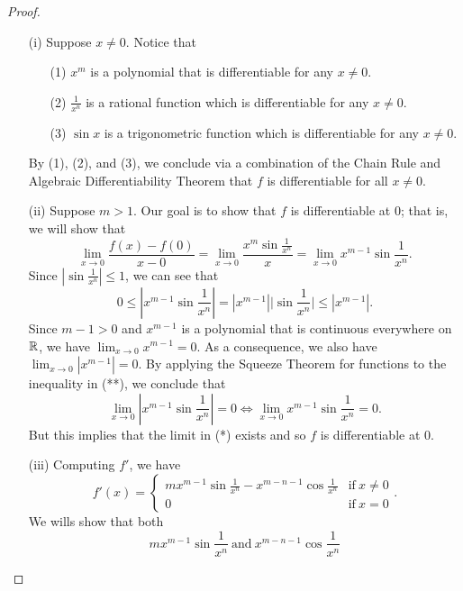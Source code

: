 \documentclass[a4paper]{article}
\begin{document}
\begin{proof}
\begin{enumerate}
    \item[(i)] Suppose \( x \neq 0  \). Notice that
        \begin{enumerate}
            \item[(1)] \( x^{m} \) is a polynomial that is differentiable for any \( x \neq 0  \).
            \item[(2)] \( \frac{ 1 }{ x^{n} }   \) is a rational function which is differentiable for any \( x \neq 0  \).
            \item[(3)] \( \sin x  \) is a trigonometric function which is differentiable for any \( x \neq 0  \).
        \end{enumerate}
        By (1), (2), and (3), we conclude via a combination of the Chain Rule and Algebraic Differentiability Theorem that \( f  \) is differentiable for all \( x \neq 0  \).
    \item[(ii)] Suppose \( m > 1  \). Our goal is to show that \( f  \) is differentiable at \( 0  \); that is, we will show that 
        \[  \lim_{ x \to 0 }  \frac{ f(x) - f(0) }{ x - 0 }  = \lim_{ x \to 0 }  \frac{ x^{m} \sin \frac{ 1 }{ x^{n} }   }{ x  } = \lim_{ x \to 0 }  x^{m-1} \sin \frac{ 1 }{ x^{n} }. \tag{*}  \]
        Since \( | \sin \frac{ 1 }{ x^{n} }  | \leq 1  \), we can see that 
        \[  0 \leq | x^{m-1} \sin \frac{ 1 }{ x^{n} }  | =  | x^{m-1} |  \Big| \sin \frac{ 1 }{ x^{n} }  \Big|   \leq | x^{m-1}  |. \tag{**}   \]
        Since \( m - 1 > 0  \) and \( x^{m-1} \) is a polynomial that is continuous everywhere on \(\mathbb{R}  \), we have \( \lim_{ x \to 0 }  x^{m-1} = 0  \). As a consequence, we also have \( \lim_{ x \to 0 } | x^{m-1} | = 0  \). By applying the Squeeze Theorem for functions to the inequality in (**), we conclude that 
        \[  \lim_{ x \to 0  }  | x^{m-1} \sin \frac{ 1 }{ x^{n} } |  = 0 \iff \lim_{ x \to 0 }  x^{m-1} \sin \frac{ 1 }{ x^{n} } = 0.  \]
        But this implies that the limit in (*) exists and so \( f  \) is differentiable at \(  0  \).
    \item[(iii)] Computing \( f' \), we have 
        \[  f'(x) = 
        \begin{cases}
            m x^{m-1} \sin \frac{ 1 }{ x^{n} }  - x^{m-n-1} \cos \frac{ 1 }{ x^{n} } &\text{if} \ x \neq 0 \\
            0 &\text{if} \ x = 0 
        \end{cases}. \]
        We wills show that both 
        \[  m x^{m-1} \sin \frac{ 1 }{ x^{n} } \ \text{and} \ x^{m-n-1} \cos \frac{ 1 }{ x^{n} }  \]

\end{enumerate}
\end{proof}
\end{document}
